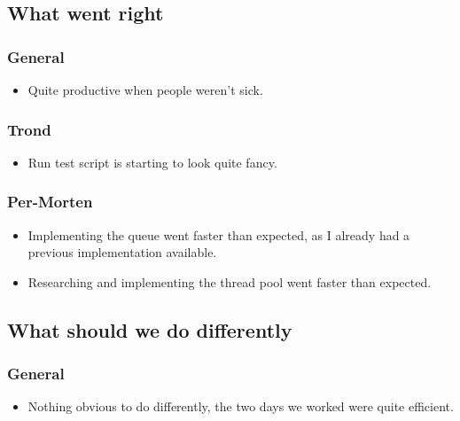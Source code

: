 \documentclass{article}
\begin{document}
\subsection*{What went right}
\subsubsection*{General}
\begin{itemize}
    \item
    Quite productive when people weren't sick.
\end{itemize}

\subsubsection*{Trond}
\begin{itemize}
    \item
    Run test script is starting to look quite fancy.
\end{itemize}

\subsubsection*{Per-Morten}
\begin{itemize}
    \item
    Implementing the queue went faster than expected, as I already had a previous implementation available.

    \item
    Researching and implementing the thread pool went faster than expected.
\end{itemize}


\subsection*{What should we do differently}
\subsubsection*{General}
\begin{itemize}
    \item
    Nothing obvious to do differently, the two days we worked were quite efficient.
\end{itemize}
\end{document}
